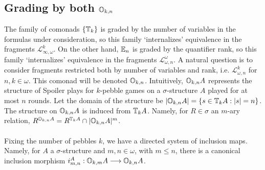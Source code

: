 \subsection{Grading by both ${\mathbb{O}_{k,n}}$}\label{sec:grading}
The family of comonads $\{{\mathbb{T}_{k}}\}$ is graded by the number of variables in the formulas under consideration, so this family `internalizes' equivalence in the fragments $\mathcal{L}^{k}_{\infty,\omega}$. On the other hand, ${\mathbb{E}_{n}}$ is graded by the quantifier rank, so this family `internalizes' equivalence in the fragments $\mathcal{L}^{\omega}_{\omega,n}$. A natural question is to consider fragments restricted both by number of variables and rank, i.e. $\mathcal{L}^{k}_{\omega,n}$ for $n,k \in \omega$. This comonad will be denoted ${\mathbb{O}_{k,n}}$. Intuitively, ${\mathbb{O}_{k,n}A}$ represents the structure of Spoiler plays for $k$-pebble games on a $\sigma$-structure $A$ played for at most $n$ rounds. Let the domain of the structure be $|{\mathbb{O}_{k,n}A}| = \{s \in {\mathbb{T}_{k}A}: |s| = n\}$. The structure on ${\mathbb{O}_{k,n}A}$ is induced from ${\mathbb{T}_{k}A}$. Namely, for $R \in \sigma$ an $m$-ary relation, $R^{{\mathbb{O}_{k,n}A}} = R^{{\mathbb{T}_{k}A}} \cap |{\mathbb{O}_{k,n}A}|^{m}$. 
\\~\\
Fixing the number of pebbles $k$, we have a directed system of inclusion maps. Namely, for $A$ a $\sigma$-structure and $m,n \in \omega$, with $m \leq n$, there is a canonical inclusion morphism $i_{m,n}^{A}:{\mathbb{O}_{k,m}A} \longrightarrow {\mathbb{O}_{k,n}A}$. \\
